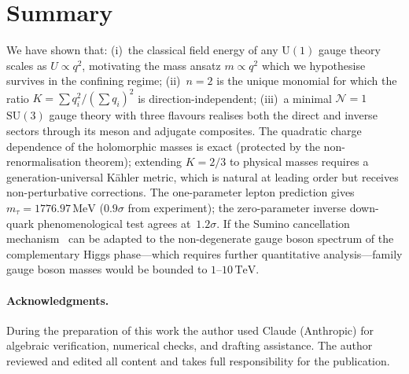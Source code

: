 \documentclass[preprint,12pt]{elsarticle}
\newcommand{\SU}{\mathrm{SU}}
\newcommand{\UU}{\mathrm{U}}
\newcommand{\MeV}{\,\mathrm{MeV}}
\newcommand{\TeV}{\,\mathrm{TeV}}
\begin{document}
\section{Summary}
We have shown that:
(i)~the classical field energy of any $\UU(1)$ gauge
theory scales as $U \propto q^2$, motivating
the mass ansatz $m \propto q^2$
which we hypothesise survives in
the confining regime;
(ii)~$n = 2$ is the unique monomial for which the ratio
$K = \sum q_i^2/(\sum q_i)^2$ is direction-independent;
(iii)~a minimal $\mathcal{N}{=}1$ $\SU(3)$ gauge theory
with three flavours realises both the direct and inverse
sectors through its meson and adjugate composites.
The quadratic charge dependence of the
holomorphic masses is exact
(protected by the non-renormalisation theorem);
extending $K = 2/3$ to physical masses
requires a generation-universal K\"ahler metric,
which is natural at leading order but receives
non-perturbative corrections.
The one-parameter lepton prediction gives
$m_\tau = 1776.97\MeV$ ($0.9\sigma$ from experiment);
the zero-parameter inverse down-quark
phenomenological test agrees at~$1.2\sigma$.
If the Sumino cancellation mechanism~\cite{Sumino:2009}
can be adapted to the non-degenerate gauge boson
spectrum of the complementary Higgs phase---which
requires further quantitative analysis---family
gauge boson masses would be bounded to
$1$--$10\TeV$.

\paragraph*{Acknowledgments.}
During the preparation of this work the author used Claude
(Anthropic) for algebraic verification, numerical checks,
and drafting assistance.
The author reviewed and edited all content and takes full
responsibility for the publication.
\end{document}
